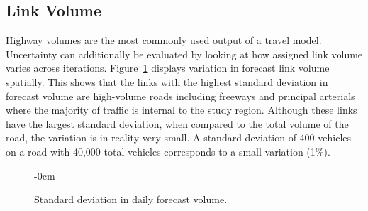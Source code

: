 \documentclass[
  futuretransp,
  submit,
  moreauthors,
]{Definitions/mdpi}
\begin{document}
\subsection{Link Volume}\label{link-volume}

Highway volumes are the most commonly used output of a travel model.
Uncertainty can additionally be evaluated by looking at how assigned
link volume varies across iterations. Figure~\ref{fig-networksd}
displays variation in forecast link volume spatially. This shows that
the links with the highest standard deviation in forecast volume are
high-volume roads including freeways and principal arterials where the
majority of traffic is internal to the study region. Although these
links have the largest standard deviation, when compared to the total
volume of the road, the variation is in reality very small. A standard
deviation of 400 vehicles on a road with 40,000 total vehicles
corresponds to a small variation (1\%).

\begin{figure}
  \begin{adjustwidth}{-\extralength}{0cm}

\end{adjustwidth}

\caption{\label{fig-networksd}Standard deviation in daily forecast
volume.}

\end{figure}%
\end{document}
